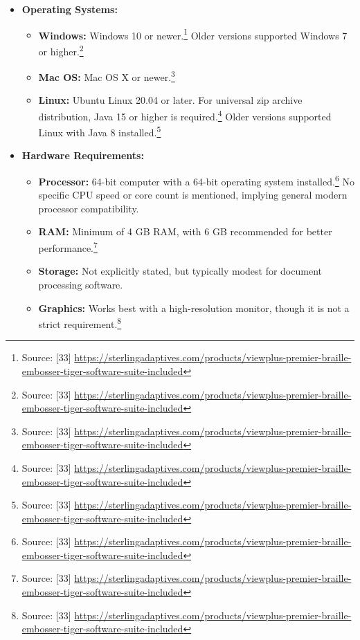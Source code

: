 \begin{itemize}
    \item \textbf{Operating Systems:}
    \begin{itemize}
        \item \textbf{Windows:} Windows 10 or newer.\footnote{Source: [33] \url{https://sterlingadaptives.com/products/viewplus-premier-braille-embosser-tiger-software-suite-included}} Older versions supported Windows 7 or higher.\footnote{Source: [33] \url{https://sterlingadaptives.com/products/viewplus-premier-braille-embosser-tiger-software-suite-included}}
        \item \textbf{Mac OS:} Mac OS X or newer.\footnote{Source: [33] \url{https://sterlingadaptives.com/products/viewplus-premier-braille-embosser-tiger-software-suite-included}}
        \item \textbf{Linux:} Ubuntu Linux 20.04 or later. For universal zip archive distribution, Java 15 or higher is required.\footnote{Source: [33] \url{https://sterlingadaptives.com/products/viewplus-premier-braille-embosser-tiger-software-suite-included}} Older versions supported Linux with Java 8 installed.\footnote{Source: [33] \url{https://sterlingadaptives.com/products/viewplus-premier-braille-embosser-tiger-software-suite-included}}
    \end{itemize}
    \item \textbf{Hardware Requirements:}
    \begin{itemize}
        \item \textbf{Processor:} 64-bit computer with a 64-bit operating system installed.\footnote{Source: [33] \url{https://sterlingadaptives.com/products/viewplus-premier-braille-embosser-tiger-software-suite-included}} No specific CPU speed or core count is mentioned, implying general modern processor compatibility.
        \item \textbf{RAM:} Minimum of 4 GB RAM, with 6 GB recommended for better performance.\footnote{Source: [33] \url{https://sterlingadaptives.com/products/viewplus-premier-braille-embosser-tiger-software-suite-included}}
        \item \textbf{Storage:} Not explicitly stated, but typically modest for document processing software.
        \item \textbf{Graphics:} Works best with a high-resolution monitor, though it is not a strict requirement.\footnote{Source: [33] \url{https://sterlingadaptives.com/products/viewplus-premier-braille-embosser-tiger-software-suite-included}}
    \end{itemize}
\end{itemize}


